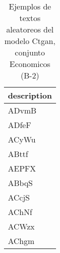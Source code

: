 \begin{table}[H]
\centering
\fontsize{8}{14}\selectfont
\caption{Ejemplos de textos aleatoreos del modelo Ctgan, conjunto Economicos (B-2)}
\label{table-sample10-economicos-b-2-ctgan-text}
\begin{tabular}{|m{50em}|}
\hline
\rowcolor[gray]{0.8}
description \\
\hline ADvmB \\
\hline ADfeF \\
\hline ACyWu \\
\hline ABttf \\
\hline AEPFX \\
\hline ABbqS \\
\hline ACcjS \\
\hline AChNf \\
\hline ACWzx \\
\hline AChgm \\
\hline
\end{tabular}
\end{table}
